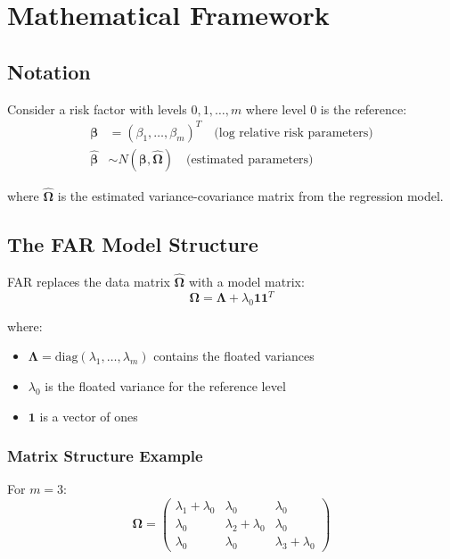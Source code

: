 \documentclass[11pt]{article}
\begin{document}
\section{Mathematical Framework}

\subsection{Notation}

Consider a risk factor with levels $0, 1, \ldots, m$ where level 0 is the reference:
\begin{align}
    \boldsymbol{\beta} &= (\beta_1, \ldots, \beta_m)^T \quad \text{(log relative risk parameters)} \\
    \hat{\boldsymbol{\beta}} &\sim N(\boldsymbol{\beta}, \hat{\boldsymbol{\Omega}}) \quad \text{(estimated parameters)}
\end{align}

where $\hat{\boldsymbol{\Omega}}$ is the estimated variance-covariance matrix from the regression model.

\subsection{The FAR Model Structure}

FAR replaces the data matrix $\hat{\boldsymbol{\Omega}}$ with a model matrix:
\begin{equation}
    \boldsymbol{\Omega} = \boldsymbol{\Lambda} + \lambda_0 \mathbf{1}\mathbf{1}^T
\end{equation}

where:
\begin{itemize}
    \item $\boldsymbol{\Lambda} = \text{diag}(\lambda_1, \ldots, \lambda_m)$ contains the floated variances
    \item $\lambda_0$ is the floated variance for the reference level
    \item $\mathbf{1}$ is a vector of ones
\end{itemize}

\subsubsection{Matrix Structure Example}
For $m = 3$:
\begin{equation}
    \boldsymbol{\Omega} = \begin{pmatrix}
        \lambda_1 + \lambda_0 & \lambda_0 & \lambda_0 \\
        \lambda_0 & \lambda_2 + \lambda_0 & \lambda_0 \\
        \lambda_0 & \lambda_0 & \lambda_3 + \lambda_0
    \end{pmatrix}
\end{equation}
\end{document}
